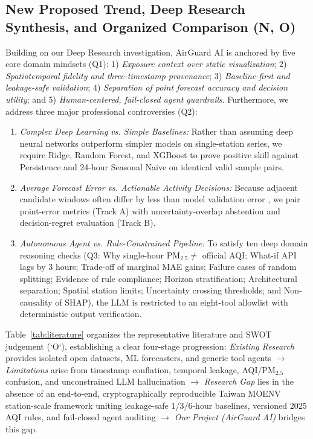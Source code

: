 \subsection{New Proposed Trend, Deep Research Synthesis, and Organized Comparison (N, O)}
Building on our Deep Research investigation, AirGuard AI is anchored by five core domain mindsets (Q1): 1) \emph{Exposure context over static visualization}; 2) \emph{Spatiotemporal fidelity and three-timestamp provenance}; 3) \emph{Baseline-first and leakage-safe validation}; 4) \emph{Separation of point forecast accuracy and decision utility}; and 5) \emph{Human-centered, fail-closed agent guardrails}. Furthermore, we address three major professional controversies (Q2):
\begin{enumerate}
    \item \emph{Complex Deep Learning vs. Simple Baselines:} Rather than assuming deep neural networks outperform simpler models on single-station series, we require Ridge, Random Forest, and XGBoost to prove positive skill against Persistence and 24-hour Seasonal Naive on identical valid sample pairs.
    \item \emph{Average Forecast Error vs. Actionable Activity Decisions:} Because adjacent candidate windows often differ by less than model validation error \cite{berlinghieri2026}, we pair point-error metrics (Track A) with uncertainty-overlap abstention and decision-regret evaluation (Track B).
    \item \emph{Autonomous Agent vs. Rule-Constrained Pipeline:} To satisfy ten deep domain reasoning checks (Q3: Why single-hour $\text{PM}_{2.5} \neq$ official AQI; What-if API lags by 3 hours; Trade-off of marginal MAE gains; Failure cases of random splitting; Evidence of rule compliance; Horizon stratification; Architectural separation; Spatial station limits; Uncertainty crossing thresholds; and Non-causality of SHAP), the LLM is restricted to an eight-tool allowlist with deterministic output verification.
\end{enumerate}

Table~\ref{tab:literature} organizes the representative literature and SWOT judgement (`O`), establishing a clear four-stage progression: \emph{Existing Research} provides isolated open datasets, ML forecasters, and generic tool agents $\rightarrow$ \emph{Limitations} arise from timestamp conflation, temporal leakage, AQI/$\text{PM}_{2.5}$ confusion, and unconstrained LLM hallucination $\rightarrow$ \emph{Research Gap} lies in the absence of an end-to-end, cryptographically reproducible Taiwan MOENV station-scale framework uniting leakage-safe 1/3/6-hour baselines, versioned 2025 AQI rules, and fail-closed agent auditing $\rightarrow$ \emph{Our Project (AirGuard AI)} bridges this gap.
